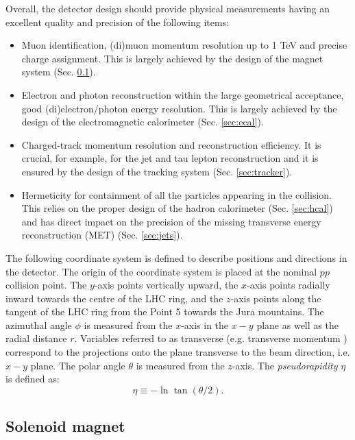 Overall, the  detector design should provide physical measurements having an excellent quality and precision of the following items:
\begin{itemize}
    \item Muon identification, (di)muon momentum resolution up to 1 TeV and precise charge assignment. This is largely achieved by the design of the magnet system (Sec. \ref{sec:magnet}).
    \item Electron and photon reconstruction within the large geometrical acceptance, good (di)electron/photon energy resolution. This is largely achieved by the design of the electromagnetic calorimeter (Sec. \ref{sec:ecal}).
    \item Charged-track momentum resolution and reconstruction efficiency. It is crucial, for example, for the jet and tau lepton reconstruction and it is ensured by the design of the tracking system (Sec. \ref{sec:tracker}).
    \item Hermeticity for containment of all the particles appearing in the collision. This relies on the proper design of the hadron calorimeter (Sec. \ref{sec:hcal}) and has direct impact on the precision of the missing transverse energy reconstruction (MET) (Sec. \ref{sec:jets}).
\end{itemize}

The following coordinate system is defined to describe positions and directions in the detector. The origin of the coordinate system is placed at the nominal $pp$ collision point. The $y$-axis points vertically upward, the $x$-axis points radially inward towards the centre of the LHC ring, and the $z$-axis points along the tangent of the LHC ring from the Point 5 towards the Jura mountains. The azimuthal angle $\phi$ is measured from the $x$-axis in the $x-y$ plane as well as the radial distance $r$. Variables referred to as transverse (e.g. transverse momentum \pt) correspond to the projections onto the plane transverse to the beam direction, i.e. $x-y$ plane. The polar angle $\theta$ is measured from the $z$-axis. The \textit{pseudorapidity} $\eta$ is defined as:
\begin{equation}
    \eta \equiv -\ln\tan(\theta/2).
\end{equation}

\subsection{Solenoid magnet}\label{sec:magnet}

